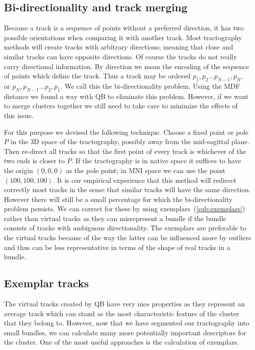\documentclass[preprint,authoryear,a4paper,10pt,onecolumn]{elsarticle}
\begin{document}
\subsection{Bi-directionality and track merging\label{sub:The-bi-directionality-problem}}

Because a track is a sequence of points without a preferred direction,
it has two possible orientations when comparing it with another track.
Most tractography methods will create tracks with arbitrary directions;
meaning that close and similar tracks can have opposite directions.  Of
course the tracks do not really carry directional information.  By
direction we mean the encoding of the sequence of points which define
the track. Thus a track may be ordered $p_{1},p_{2}\ldots
p_{N-1},p_{N}$, or $p_{N},p_{N-1}\ldots p_{2},p_{1}$. We call this the
bi-directionality problem. Using the MDF distance we found a way with QB
to eliminate this problem. However, if we want to merge clusters
together we still need to take care to minimize the effects of this
issue.

For this purpose we devised the following technique. Choose a fixed
point or pole $P$ in the 3D space of the tractography, possibly away
from the mid-sagittal plane. Then re-direct all tracks so that the first
point of every track is whichever of the two ends is closer to $P$. If
the tractography is in native space it suffices to have the origin
$(0,0,0)$ as the pole point; in MNI space we can use the point
$(100,100,100)$. It is our empirical experience that this method will
redirect correctly most tracks in the sense that similar tracks will
have the same direction.  However there will still be a small percentage
for which the bi-directionality problem persists. We can correct for
these by using exemplars~(\ref{sub:exemplars}) rather than virtual
tracks as they can misrepresent a bundle if the bundle consists of
tracks with ambiguous directionality. The exemplars are preferable to
the virtual tracks because of the way the latter can be influenced more
by outliers and thus can be less representative in terms of the shape of
real tracks in a bundle.

\subsection{Exemplar tracks\label{sub:exemplars}}

The virtual tracks created by QB have very nice properties as they
represent an average track which can stand as the most characteristic
feature of the cluster that they belong to. However, now that we have
segmented our tractography into small bundles, we can calculate many more
potentially important descriptors for the cluster. One of the most
useful approaches is the calculation of exemplars.
\end{document}
